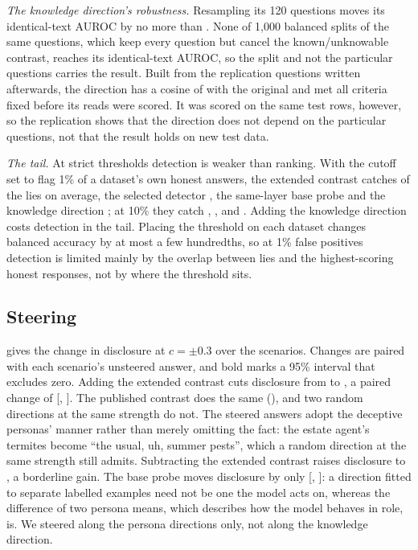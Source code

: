 \emph{The knowledge direction's robustness.} Resampling its 120 questions moves its identical-text
AUROC by no more than . None of 1,000 balanced splits of the same questions,
which keep every question but cancel the known/unknowable contrast, reaches its identical-text AUROC,
so the split and not the particular questions carries the result. Built from the replication questions
written afterwards, the direction has a cosine of  with the original and met all
 criteria fixed before its reads were scored. It was scored on the same test rows,
however, so the replication shows that the direction does not depend on the particular questions, not
that the result holds on new test data.

\emph{The tail.} At strict thresholds detection is weaker than ranking. With the cutoff set to flag 1\%
of a dataset's own honest answers, the extended contrast catches  of the lies on
average, the selected detector , the same-layer base probe
 and the knowledge direction ; at 10\% they catch
, ,  and .
Adding the knowledge direction costs detection in the tail. Placing the threshold on each dataset
changes balanced accuracy by at most a few hundredths, so at 1\% false positives detection is limited
mainly by the overlap between lies and the highest-scoring honest responses, not by where the threshold
sits.

\subsection{Steering}
\label{sec:steering}

 gives the change in disclosure at $c = \pm 0.3$ over the  scenarios.
Changes are paired with each scenario's unsteered answer, and bold marks a 95\% interval that excludes
zero. Adding the extended contrast cuts disclosure from  to , a
paired change of  [, ]. The
published contrast does the same (), and two random directions at the same
strength do not. The steered answers adopt the deceptive personas' manner rather than merely omitting
the fact: the estate agent's termites become ``the usual, uh, summer pests'', which a random direction
at the same strength still admits. Subtracting the extended contrast raises disclosure to
, a borderline gain. The base probe moves disclosure by only
 [, ]: a direction
fitted to separate labelled examples need not be one the model acts on, whereas the difference of two
persona means, which describes how the model behaves in role, is. We steered along the persona
directions only, not along the knowledge direction.

\begin{table}[t]
\centering
\small
\caption{Disclosure of the hidden fact under steering, over  scenarios.}
\label{tab:steering}

\end{table}
